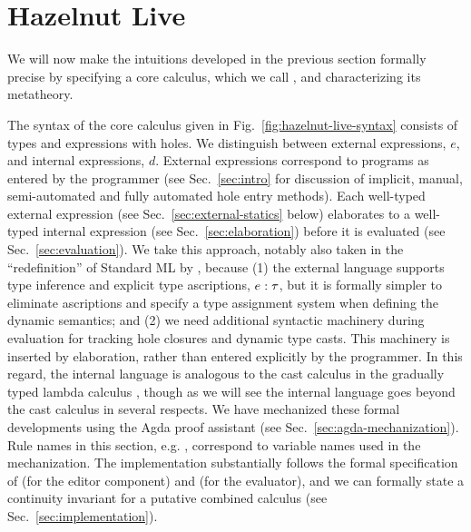 \newcommand{\calculusSec}{Hazelnut Live}
\section{\protect\calculusSec}
\label{sec:calculus}


We will now make the intuitions developed in the previous section formally
precise by specifying a core calculus, which we call \HazelnutLive, and
characterizing its metatheory.

 The syntax of the core calculus given in
Fig.~\ref{fig:hazelnut-live-syntax} consists of types and expressions with
holes.  We distinguish between {external} expressions, $e$, and {internal}
expressions, $d$.  External expressions correspond to programs as entered
by the programmer (see Sec.~\ref{sec:intro} for discussion of implicit,
manual, semi-automated and fully automated hole entry methods).  Each
well-typed external expression (see Sec.~\ref{sec:external-statics} below)
elaborates to a well-typed internal expression (see
Sec.~\ref{sec:elaboration}) before it is evaluated (see
Sec.~\ref{sec:evaluation}).  We take this approach, notably also taken in
the ``redefinition'' of Standard ML by \citet{Harper00atype-theoretic},
because (1) the external language supports type inference and explicit type
ascriptions, $e : \tau$, but it is formally simpler to eliminate
ascriptions and specify a type assignment system when defining the dynamic
semantics; and (2) we need additional syntactic machinery during evaluation
for tracking hole closures and dynamic type casts.  This machinery is
inserted by elaboration, rather than entered explicitly by the programmer.
In this regard, the internal language is analogous to the cast calculus in
the gradually typed lambda calculus
\cite{DBLP:conf/snapl/SiekVCB15,Siek06a}, though as we will see the
\HazelnutLive internal language goes beyond the cast calculus in several
respects. We have mechanized these formal developments using the Agda proof
assistant \cite{norell:thesis,norell2009dependently} (see
Sec.~\ref{sec:agda-mechanization}). Rule names in this section,
e.g. , correspond to variable names used in the
mechanization. The \Hazel implementation substantially follows the formal
specification of \Hazelnut (for the editor component) and \HazelnutLive
(for the evaluator), and we can formally state a continuity invariant for a
putative combined calculus (see Sec.~\ref{sec:implementation}).

